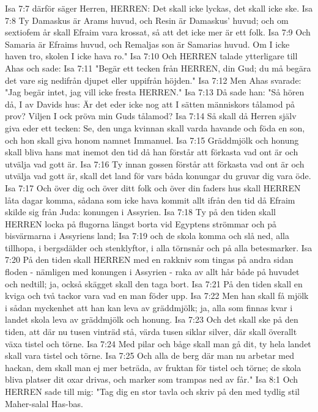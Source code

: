Isa 7:7  därför säger Herren, HERREN: Det skall icke lyckas, det skall icke ske.
Isa 7:8  Ty Damaskus är Arams huvud, och Resin är Damaskus' huvud; och om sextiofem år skall Efraim vara krossat, så att det icke mer är ett folk.
Isa 7:9  Och Samaria är Efraims huvud, och Remaljas son är Samarias huvud. Om I icke haven tro, skolen I icke hava ro."
Isa 7:10  Och HERREN talade ytterligare till Ahas och sade:
Isa 7:11  "Begär ett tecken från HERREN, din Gud; du må begära det vare sig nedifrån djupet eller uppifrån höjden."
Isa 7:12  Men Ahas svarade: "Jag begär intet, jag vill icke fresta HERREN."
Isa 7:13  Då sade han: "Så hören då, I av Davids hus: Är det eder icke nog att I sätten människors tålamod på prov? Viljen I ock pröva min Guds tålamod?
Isa 7:14  Så skall då Herren själv giva eder ett tecken: Se, den unga kvinnan skall varda havande och föda en son, och hon skall giva honom namnet Immanuel.
Isa 7:15  Gräddmjölk och honung skall bliva hans mat inemot den tid då han förstår att förkasta vad ont är och utvälja vad gott är.
Isa 7:16  Ty innan gossen förstår att förkasta vad ont är och utvälja vad gott är, skall det land för vars båda konungar du gruvar dig vara öde.
Isa 7:17  Och över dig och över ditt folk och över din faders hus skall HERREN låta dagar komma, sådana som icke hava kommit allt ifrån den tid då Efraim skilde sig från Juda: konungen i Assyrien.
Isa 7:18  Ty på den tiden skall HERREN locka på flugorna längst borta vid Egyptens strömmar och på bisvärmarna i Assyriens land;
Isa 7:19  och de skola komma och slå ned, alla tillhopa, i bergsdälder och stenklyftor, i alla törnsnår och på alla betesmarker.
Isa 7:20  På den tiden skall HERREN med en rakkniv som tingas på andra sidan floden - nämligen med konungen i Assyrien - raka av allt hår både på huvudet och nedtill; ja, också skägget skall den taga bort.
Isa 7:21  På den tiden skall en kviga och två tackor vara vad en man föder upp.
Isa 7:22  Men han skall få mjölk i sådan myckenhet att han kan leva av gräddmjölk; ja, alla som finnas kvar i landet skola leva av gräddmjölk och honung.
Isa 7:23  Och det skall ske på den tiden, att där nu tusen vinträd stå, värda tusen siklar silver, där skall överallt växa tistel och törne.
Isa 7:24  Med pilar och båge skall man gå dit, ty hela landet skall vara tistel och törne.
Isa 7:25  Och alla de berg där man nu arbetar med hackan, dem skall man ej mer beträda, av fruktan för tistel och törne; de skola bliva platser dit oxar drivas, och marker som trampas ned av får."
Isa 8:1  Och HERREN sade till mig: "Tag dig en stor tavla och skriv på den med tydlig stil Maher-salal Has-bas.
